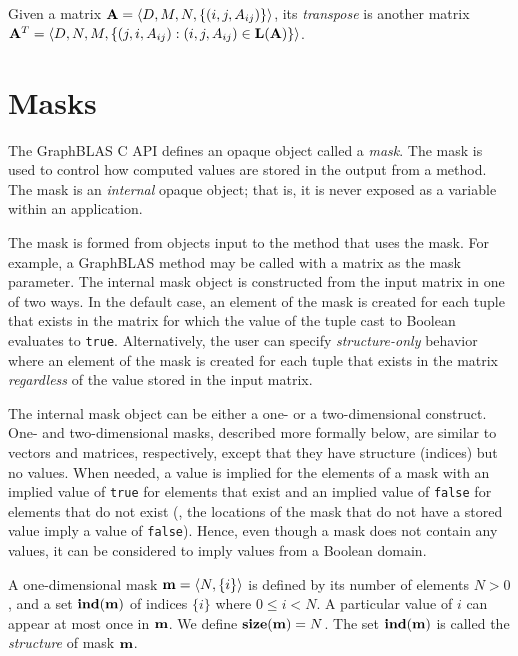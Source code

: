 Given a matrix ${\bf A} = \langle D, M, N, \{ (i,j,A_{ij}) \} \rangle$,
its \emph{transpose} is another matrix ${\bf A}^T = \langle D, N, M, \{
(j,i,A_{ij}) : (i,j,A_{ij}) \in \mathbf{L}({\bf A}) \} \rangle$.

\section{Masks}
\label{Sec:Masks}

The GraphBLAS C API defines an opaque object called a \emph{mask}.  The mask
is used to control how computed values are stored in the output from a method. 
The mask is an \emph{internal} opaque object; that is, it is never exposed as a variable
within an application. 

The mask is formed from objects input to the method that uses 
the mask.  For example, a GraphBLAS method may be called with a matrix as the mask
parameter.   The internal mask object is constructed from the input matrix in one
of two ways.  In the default case, an element of the mask is created for each 
tuple that exists in the matrix for which the value of the tuple cast to Boolean 
evaluates to {\tt true}.  Alternatively, the user can specify {\em structure-only} behavior where
an element of the mask is created for each tuple that exists in the matrix 
{\em regardless} of the value stored in the input matrix.

The internal mask object can be either a one- or a two-dimensional construct.  One- and
two-dimensional masks, described more formally below, are similar to
vectors and matrices, respectively, except that they have structure
(indices) but no values.  When needed, a value is implied for the elements of a 
mask with an implied value of {\tt true} for elements that exist 
and an implied value of {\tt false} for elements that do not exist (\ie,
the locations of the mask that do not have a stored value imply a value of {\tt false}).
Hence, even though a mask does not contain any values, it can be 
considered to imply values from a Boolean domain.

A one-dimensional mask ${\bf m} = \langle N, \{ i \} \rangle$ is
defined by its number of elements $N>0$, and a set $\mathbf{ind}({\bf m})$
of indices $\{ i \}$ where $0 \leq i < N$.  A particular value of $i$ can
appear at most once in ${\bf m}$. We define $\mathbf{size}({\bf m})
= N$. The set $\mathbf{ind}({\bf m})$ is called the \emph{structure} of mask ${\bf m}$.

